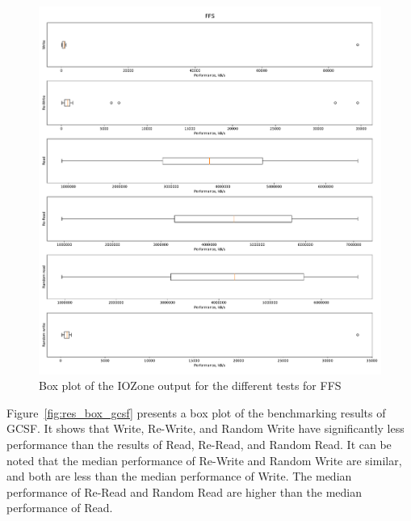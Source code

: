 \begin{figure}[!htb]
	\label{fig:res_box_ffs}
	\begin{center}
		\includegraphics[width=1.0\textwidth]{figures/benchmarking/ffs/FFS-box.pdf}
	\end{center}
	\caption{Box plot of the IOZone output for the different tests for FFS}
\end{figure}

Figure~\ref{fig:res_box_gcsf} presents a box plot of the benchmarking results of GCSF. It shows that Write, Re-Write, and Random Write have significantly less performance than the results of Read, Re-Read, and Random Read. It can be noted that the median performance of Re-Write and Random Write are similar, and both are less than the median performance of Write. The median performance of Re-Read and Random Read are higher than the median performance of Read.

